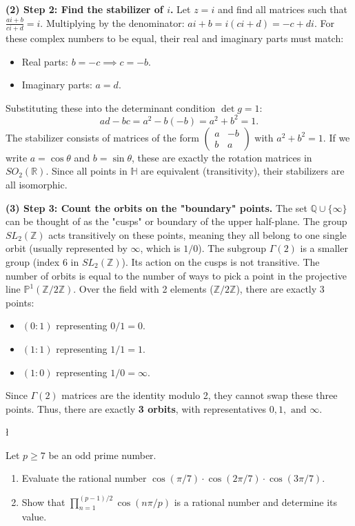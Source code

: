 \begin{solution}
\textbf{(2) Step 2: Find the stabilizer of $i$.}
Let $z=i$ and find all matrices such that $\frac{ai+b}{ci+d} = i$.
Multiplying by the denominator: $ai + b = i(ci + d) = -c + di$.
For these complex numbers to be equal, their real and imaginary parts must match:
\begin{itemize}
    \item Real parts: $b = -c \implies c = -b$.
    \item Imaginary parts: $a = d$.
\end{itemize}
Substituting these into the determinant condition $\det g = 1$:
\[ ad - bc = a^2 - b(-b) = a^2 + b^2 = 1. \]
The stabilizer consists of matrices of the form $\begin{pmatrix} a & -b \\ b & a \end{pmatrix}$ with $a^2 + b^2 = 1$.
If we write $a = \cos \theta$ and $b = \sin \theta$, these are exactly the rotation matrices in $SO_2(\mathbb{R})$.
Since all points in $\mathbb{H}$ are equivalent (transitivity), their stabilizers are all isomorphic.

\textbf{(3) Step 3: Count the orbits on the "boundary" points.}
The set $\mathbb{Q} \cup \{ \infty \}$ can be thought of as the "cusps" or boundary of the upper half-plane.
The group $SL_2(\mathbb{Z})$ acts transitively on these points, meaning they all belong to one single orbit (usually represented by $\infty$, which is $1/0$).
The subgroup $\Gamma(2)$ is a smaller group (index 6 in $SL_2(\mathbb{Z})$). Its action on the cusps is not transitive.
The number of orbits is equal to the number of ways to pick a point in the projective line $\mathbb{P}^1(\mathbb{Z}/2\mathbb{Z})$.
Over the field with 2 elements ($\mathbb{Z}/2\mathbb{Z}$), there are exactly 3 points:
\begin{itemize}
    \item $(0:1)$ representing $0/1 = 0$.
    \item $(1:1)$ representing $1/1 = 1$.
    \item $(1:0)$ representing $1/0 = \infty$.
\end{itemize}
Since $\Gamma(2)$ matrices are the identity modulo 2, they cannot swap these three points. Thus, there are exactly \textbf{3 orbits}, with representatives $0, 1, \text{ and } \infty$.
\end{solution}

\begin{exercise}
\l\label{2014:8}

\label{algebra:2014:8}Let $p \geq 7$ be an odd prime number.
\begin{enumerate}
    \item Evaluate the rational number $\cos(\pi/7) \cdot \cos(2\pi/7) \cdot \cos(3\pi/7)$.
    \item Show that $\prod_{n=1}^{(p-1)/2} \cos(n\pi/p)$ is a rational number and determine its value.
\end{enumerate}
\end{exercise}

